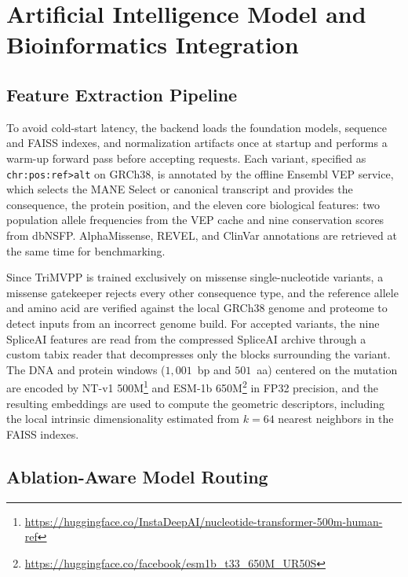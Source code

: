 \section{Artificial Intelligence Model and Bioinformatics Integration}
\label{sec:ai_integration}

\subsection{Feature Extraction Pipeline}

To avoid cold-start latency, the backend loads the foundation models, sequence and FAISS indexes, and normalization artifacts once at startup and performs a warm-up forward pass before accepting requests. Each variant, specified as \texttt{chr:pos:ref>alt} on GRCh38, is annotated by the offline Ensembl VEP service, which selects the MANE Select or canonical transcript and provides the consequence, the protein position, and the eleven core biological features: two population allele frequencies from the VEP cache and nine conservation scores from dbNSFP. AlphaMissense, REVEL, and ClinVar annotations are retrieved at the same time for benchmarking.

Since TriMVPP is trained exclusively on missense single-nucleotide variants, a missense gatekeeper rejects every other consequence type, and the reference allele and amino acid are verified against the local GRCh38 genome and proteome to detect inputs from an incorrect genome build. For accepted variants, the nine SpliceAI features are read from the compressed SpliceAI archive through a custom tabix reader that decompresses only the blocks surrounding the variant. The DNA and protein windows ($1{,}001$~bp and $501$~aa) centered on the mutation are encoded by NT-v1 500M\footnote{\url{https://huggingface.co/InstaDeepAI/nucleotide-transformer-500m-human-ref}} and ESM-1b 650M\footnote{\url{https://huggingface.co/facebook/esm1b_t33_650M_UR50S}} in FP32 precision, and the resulting embeddings are used to compute the geometric descriptors, including the local intrinsic dimensionality estimated from $k = 64$ nearest neighbors in the FAISS indexes.

\subsection{Ablation-Aware Model Routing}

